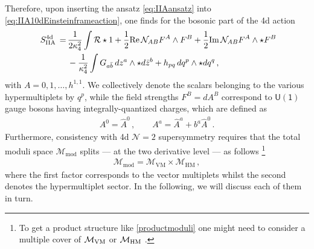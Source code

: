 Therefore, upon inserting the ansatz \eqref{eq:IIAansatz} into \eqref{eq:IIA10dEinsteinframeaction}, one finds for the bosonic part of the 4d action \cite{Bodner:1990zm}
%
\begin{equation}\label{eq:IIAaction4d}
	\begin{aligned}
		\ S^{\text{4d}}_{\rm IIA}\, =\, & \frac{1}{2\kappa^2_4} \int \mathcal{R} \star 1 + \frac{1}{2} \text{Re}\, \mathcal{N}_{AB} F^A \wedge F^B + \frac{1}{2} \text{Im}\, \mathcal{N}_{AB} F^A \wedge \star F^B \\
		& - \frac{1}{\kappa^2_4} \int G_{a\bar b}\, d z^a\wedge \star d\bar z^b + h_{pq}\, d q^p \wedge \star d q^q\, ,
	\end{aligned}
\end{equation}
%
with $A=0,1, \ldots, h^{1,1}$. We collectively denote the scalars belonging to the various hypermultiplets by $q^p$, while the field strengths $F^B=dA^B$ correspond to $\mathsf{U(1)}$ gauge bosons having integrally-quantized charges, which are defined as
%
\begin{align}\label{eq:rotatedbasisvectorfields4d}
 A^0=\hat{A}^0\, , \qquad  A^a= \hat{A}^a+b^a \hat{A}^0\, .
\end{align} 
%
Furthermore, consistency with 4d $\mathcal{N}=2$ supersymmetry requires that the total moduli space $\mathcal{M}_{\text{mod}}$ splits --- at the two derivative level --- as follows \cite{Candelas:1990pi}\footnote{\label{fnote:modspaceprod}To get a product structure like \eqref{productmoduli} one might need to consider a multiple cover of ${\cal M}_{\rm VM}$ or ${\cal M}_{\rm HM}$ \cite{Seiberg:1996ns}.}
%
\begin{align}\label{productmoduli}
 \mathcal{M}_{\text{mod}} = \mathcal{M}_\text{VM} \times \mathcal{M}_\text{HM}\, ,
\end{align} 
%
where the first factor corresponds to the vector multiplets whilst the second denotes the hypermultiplet sector. In the following, we will discuss each of them in turn.
 
